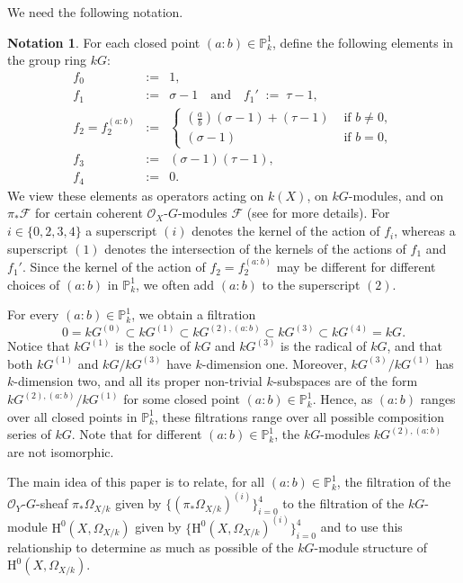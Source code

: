 \documentclass{amsart}
\numberwithin{equation}{section}
\numberwithin{table}{section}
\theoremstyle{plain}
\theoremstyle{definition}
\newtheorem{nota}[theorem]{Notation}
\theoremstyle{remark}
\newcommand{\HH}{\mathrm{H}}
\begin{document}
We need the following notation.
\begin{nota}
\label{not:operators}
For each closed point $(a:b)\in\mathbb{P}^1_k$, define the following elements in the group ring $kG$:
\begin{eqnarray*}
f_0&:=&1,\\
f_1&:=&\sigma-1\quad \mbox{and} \quad f_1'\;:=\;\tau-1,\\
f_2=f_2^{(a:b)}&:=&
\left\{\begin{array}{cl}
(\frac{a}{b})(\sigma-1)+(\tau-1) & \mbox{ if } b\ne 0,\\
(\sigma-1) & \mbox{ if } b=0,
\end{array}\right.\\
f_3&:=&(\sigma-1)(\tau-1),\\
f_4&:=&0.
\end{eqnarray*}
We view these elements as operators acting on $k(X)$, on $kG$-modules, and on $\pi_*\mathcal{F}$ for certain coherent $\mathcal{O}_X$-$G$-modules $\mathcal{F}$ (see \cite[Section 2]{BleherChinburgKontogeorgis2020} for more details). For $i\in\{0,2,3,4\}$ a superscript $(i)$ denotes the kernel of the action of $f_i$, whereas a superscript $(1)$ denotes the intersection of the kernels of the actions of $f_1$ and $f_1'$. Since the kernel of the action of $f_2=f_2^{(a:b)}$ may be different for different choices of $(a:b)$ in $\mathbb{P}^1_k$, we often add $(a:b)$ to the superscript $(2)$.
\end{nota}

For every $(a:b)\in \mathbb{P}^1_k$, we obtain a filtration 
$$0=kG^{(0)} \subset kG^{(1)} \subset kG^{(2),(a:b)} \subset kG^{(3)} \subset kG^{(4)}=kG.$$
Notice that $kG^{(1)}$ is the socle of $kG$ and $kG^{(3)}$ is the radical of $kG$, and that both $kG^{(1)}$ and $kG/kG^{(3)}$ have $k$-dimension one. Moreover, $kG^{(3)}/kG^{(1)}$ has $k$-dimension two, and all its proper non-trivial $k$-subspaces are of the form $kG^{(2),(a:b)}/kG^{(1)}$ for some closed point $(a:b)\in \mathbb{P}^1_k$. Hence, as $(a:b)$ ranges over all closed points in $\mathbb{P}^1_k$, these filtrations range over all possible composition series of $kG$. Note that for different $(a:b)\in \mathbb{P}^1_k$, the $kG$-modules $kG^{(2),(a:b)}$ are not isomorphic.

The main idea of this paper is to relate, for all $(a:b)\in \mathbb{P}^1_k$, the filtration of the $\mathcal{O}_Y$-$G$-sheaf $\pi_*\Omega_{X/k}$ given by $\{(\pi_*\Omega_{X/k})^{(i)}\}_{i=0}^4$ to the filtration of the $kG$-module $\HH^0(X,\Omega_{X/k})$ given by $\{\HH^0(X,\Omega_{X/k})^{(i)}\}_{i=0}^4$ and to use this relationship to determine as much as possible of the $kG$-module structure of $\HH^0(X,\Omega_{X/k})$.
\end{document}
